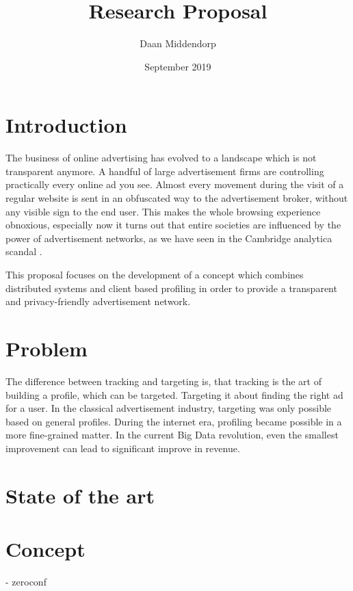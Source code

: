 \documentclass[]{article}
\title{Research Proposal}
\author{Daan Middendorp}
\date{September 2019}
\begin{document}
\maketitle

\section{Introduction}

The business of online advertising has evolved to a landscape which is not transparent anymore. A handful of large advertisement firms are controlling practically every online ad you see. Almost every movement during the visit of a regular website is sent in an obfuscated way to the advertisement broker, without any visible sign to the end user. This makes the whole browsing experience obnoxious, especially now it turns out that entire societies are influenced by the power of advertisement networks, as we have seen in the Cambridge analytica scandal .

This proposal focuses on the development of a concept which combines distributed systems and client based profiling in order to provide a transparent and privacy-friendly advertisement network. 

\section{Problem}

The difference between tracking and targeting is, that tracking is the art of building a profile, which can be targeted. Targeting it about finding the right ad for a user. In the classical advertisement industry, targeting was only possible based on general profiles. During the internet era, profiling became possible in a more fine-grained matter. In the current Big Data revolution, even the smallest improvement can lead to significant improve in revenue.



\section{State of the art}



\section {Concept}

- zeroconf
\end{document}
